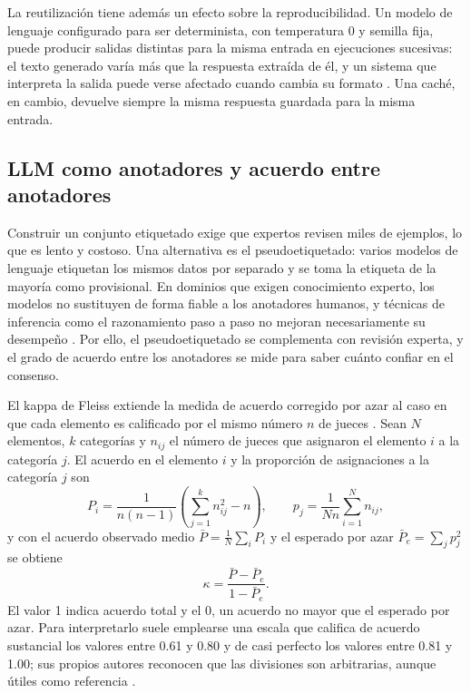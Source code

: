 La reutilización tiene además un efecto sobre la reproducibilidad. Un modelo de lenguaje configurado para ser determinista, con temperatura 0 y semilla fija, puede producir salidas distintas para la misma entrada en ejecuciones sucesivas: el texto generado varía más que la respuesta extraída de él, y un sistema que interpreta la salida puede verse afectado cuando cambia su formato \cite{atil2025_nondeterminism}. Una caché, en cambio, devuelve siempre la misma respuesta guardada para la misma entrada.

\subsection{LLM como anotadores y acuerdo entre anotadores}\label{sec:mt_anotacion}

Construir un conjunto etiquetado exige que expertos revisen miles de ejemplos, lo que es lento y costoso. Una alternativa es el pseudoetiquetado: varios modelos de lenguaje etiquetan los mismos datos por separado y se toma la etiqueta de la mayoría como provisional. En dominios que exigen conocimiento experto, los modelos no sustituyen de forma fiable a los anotadores humanos, y técnicas de inferencia como el razonamiento paso a paso no mejoran necesariamente su desempeño \cite{tseng2025_expert_annotators}. Por ello, el pseudoetiquetado se complementa con revisión experta, y el grado de acuerdo entre los anotadores se mide para saber cuánto confiar en el consenso.

El kappa de Fleiss extiende la medida de acuerdo corregido por azar al caso en que cada elemento es calificado por el mismo número $n$ de jueces \cite{fleiss1971_kappa}. Sean $N$ elementos, $k$ categorías y $n_{ij}$ el número de jueces que asignaron el elemento $i$ a la categoría $j$. El acuerdo en el elemento $i$ y la proporción de asignaciones a la categoría $j$ son
\begin{equation}
P_i = \frac{1}{n(n-1)} \left( \sum_{j=1}^{k} n_{ij}^2 - n \right), \qquad p_j = \frac{1}{N n} \sum_{i=1}^{N} n_{ij},
\end{equation}
y con el acuerdo observado medio $\bar{P} = \frac{1}{N}\sum_i P_i$ y el esperado por azar $\bar{P}_e = \sum_j p_j^2$ se obtiene
\begin{equation}
\kappa = \frac{\bar{P} - \bar{P}_e}{1 - \bar{P}_e}.
\end{equation}
El valor 1 indica acuerdo total y el 0, un acuerdo no mayor que el esperado por azar. Para interpretarlo suele emplearse una escala que califica de acuerdo sustancial los valores entre 0.61 y 0.80 y de casi perfecto los valores entre 0.81 y 1.00; sus propios autores reconocen que las divisiones son arbitrarias, aunque útiles como referencia \cite{landis1977_kappa}.

